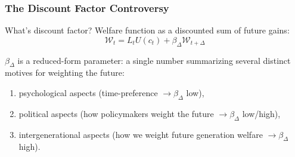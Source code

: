 \documentclass[xcolor=x11names,compress,aspectratio=169]{beamer}%
\makeatletter
\newenvironment{stepenumeratewithalert}{\begin{enumerate}[<+-| alert@+>]}{\end{enumerate}}
\newenvironment{stepitemizewithalert}{\begin{itemize}[<+-| alert@+>]}{\end{itemize} }
\renewenvironment{itemize}{\begin{compactitemize}[<+-| alert@+>]}{\end{compactitemize}}
\renewenvironment{stepitemizewithalert}{\begin{compactitemize}[<+-| alert@+>]}{\end{compactitemize}}
\renewenvironment{stepitemizewithalert}{\begin{itemize}}{\end{itemize}}
\renewenvironment{stepenumeratewithalert}{\begin{enumerate}}{\end{enumerate}}
\makeatother
\begin{document}
\begin{frame}%
%

\frametitle{The Discount Factor Controversy}%


\begin{stepitemizewithalert}
\item What's discount factor? Welfare function as a discounted sum of future
gains:%
\[
\mathcal{W}_{t}=L_{t}U\left(  c_{t}\right)  +\beta_{\Delta}\mathcal{W}%
_{t+\Delta}%
\]%
\vspace{2ex}%


\item $\beta_{\Delta}$ is a reduced-form parameter: a single number summarizing
several distinct motives for weighting the future:%
\vspace{2ex}%


\begin{stepenumeratewithalert}
\item psychological aspects (time-preference $\rightarrow\beta_{\Delta}$
low),
\vspace{1.5ex}%


\item political aspects (how policymakers weight the future $\rightarrow
\beta_{\Delta}$ low/high),%
\vspace{1.5ex}%


\item intergenerational aspects (how we weight future generation welfare
$\rightarrow\beta_{\Delta}$ high).
\end{stepenumeratewithalert}
\end{stepitemizewithalert}

%

\transboxout
\end{frame}%
%
\end{document}
